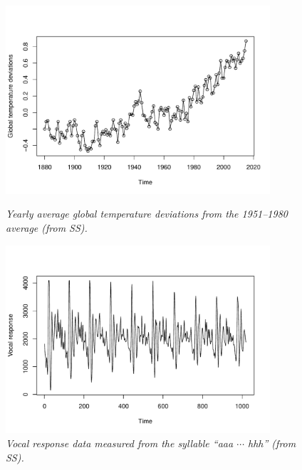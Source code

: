 \documentclass{article}
\begin{document}
\begin{figure}[p]
\centering
\includegraphics[width=0.875\textwidth]{fig/gw-1.pdf}
\caption{\it Yearly average global temperature deviations from the 1951--1980
  average (from SS).}
\label{fig:gw}

\medskip
\includegraphics[width=0.875\textwidth]{fig/speech-1.pdf}
\caption{\it Vocal response data measured from the syllable ``aaa $\cdots$
  hhh'' (from SS).} 
\label{fig:speech}
\end{figure}
\end{document}
